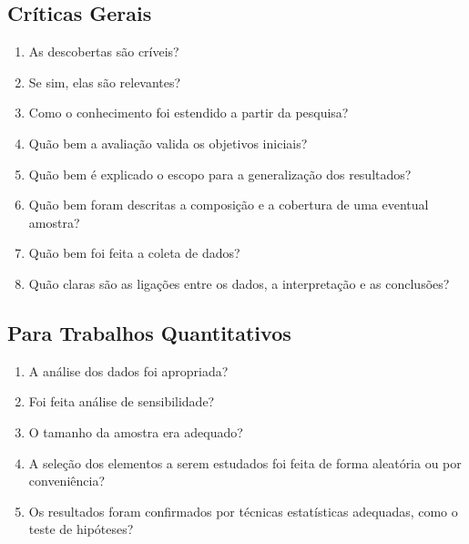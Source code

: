 \documentclass[a4paper,12pt]{article}
\begin{document}
\subsection*{Críticas Gerais}
\begin{enumerate}[label=\arabic*.]
    \item As descobertas são críveis?  
    \item Se sim, elas são relevantes? 
    \item Como o conhecimento foi estendido a partir da pesquisa? 
    \item Quão bem a avaliação valida os objetivos iniciais? 
    \item Quão bem é explicado o escopo para a generalização dos resultados? 
    \item Quão bem foram descritas a composição e a cobertura de uma eventual amostra? 
    \item Quão bem foi feita a coleta de dados? 
    \item Quão claras são as ligações entre os dados, a interpretação e as conclusões? 
    
\end{enumerate}

\subsection*{Para Trabalhos Quantitativos}
\begin{enumerate}[label=\arabic*.]
    \item A análise dos dados foi apropriada? 
    \item Foi feita análise de sensibilidade? 
    \item O tamanho da amostra era adequado? 
    \item A seleção dos elementos a serem estudados foi feita de forma aleatória ou por conveniência? 
    \item Os resultados foram confirmados por técnicas estatísticas adequadas, como o teste de hipóteses? 
\end{enumerate}
\end{document}
